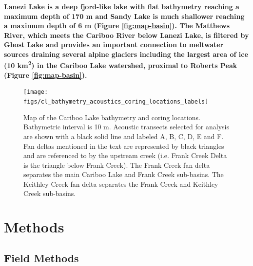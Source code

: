 \documentclass[Royal,times,doublespace,sageh]{sagej}
\begin{document}
\textbf{Lanezi Lake is a deep fjord-like lake with flat bathymetry
reaching a maximum depth of 170 m and Sandy Lake is much shallower
reaching a maximum depth of 6 m (Figure \ref{fig:map-basin}). The
Matthews River, which meets the Cariboo River below Lanezi Lake, is
filtered by Ghost Lake and provides an important connection to meltwater
sources draining several alpine glaciers including the largest area of
ice (10 km\textsuperscript{2}) in the Cariboo Lake watershed, proximal
to Roberts Peak (Figure \ref{fig:map-basin}).}

\begin{figure}

{\centering \texttt{[image: figs/cl\_bathymetry\_acoustics\_coring\_locations\_labels]} 

}

\caption{Map of the Cariboo Lake bathymetry and coring locations. Bathymetric interval is 10 m. Acoustic transects selected for analysis are shown with a black solid line and labeled A, B, C, D, E and F. Fan deltas mentioned in the text are represented by black triangles and are referenced to by the upstream creek (i.e. Frank Creek Delta is the triangle below Frank Creek). The Frank Creek fan delta separates the main Cariboo Lake and Frank Creek sub-basins. The Keithley Creek fan delta separates the Frank Creek and Keithley Creek sub-basins.}\label{fig:map-lake}
\end{figure}

\hypertarget{methods}{%
\section{Methods}\label{methods}}

\hypertarget{field-methods}{%
\subsection{Field Methods}\label{field-methods}}
\end{document}

